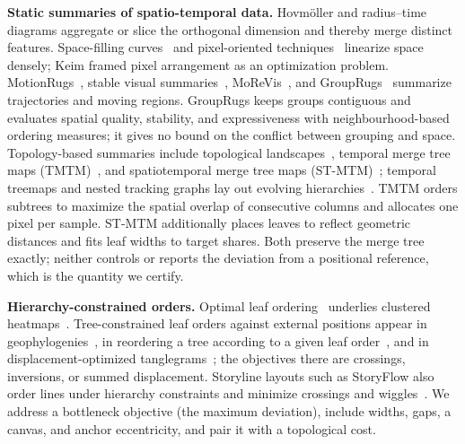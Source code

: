 \documentclass[review]{vgtc}                 %
\begin{document}
\textbf{Static summaries of spatio-temporal data.}
Hovm\"oller and radius--time diagrams aggregate or slice the orthogonal dimension and thereby merge distinct features. Space-filling curves~\cite{Franke:2021:1DP,Zhou:2021:DSF} and pixel-oriented techniques~\cite{Keim:2000:PIX} linearize space densely; Keim framed pixel arrangement as an optimization problem. MotionRugs~\cite{Buchmueller:2019:MR}, stable visual summaries~\cite{Wulms:2021:SVS}, MoReVis~\cite{Valdrighi:2024:MRV}, and GroupRugs~\cite{Stolk:2025:GR} summarize trajectories and moving regions. GroupRugs keeps groups contiguous and evaluates spatial quality, stability, and expressiveness with neighbourhood-based ordering measures; it gives no bound on the conflict between grouping and space. Topology-based summaries include topological landscapes~\cite{Weber:2007:TL,Beketayev:2012:GPTL}, temporal merge tree maps (TMTM)~\cite{Koepp:2023:TMTM}, and spatiotemporal merge tree maps (ST-MTM)~\cite{STMTM:2026}; temporal treemaps and nested tracking graphs lay out evolving hierarchies~\cite{Koepp:2019:TT,Lukasczyk:2017:NTG}. TMTM orders subtrees to maximize the spatial overlap of consecutive columns and allocates one pixel per sample. ST-MTM additionally places leaves to reflect geometric distances and fits leaf widths to target shares. Both preserve the merge tree exactly; neither controls or reports the deviation from a positional reference, which is the quantity we certify.

\textbf{Hierarchy-constrained orders.}
Optimal leaf ordering~\cite{BarJoseph:2001:OLO} underlies clustered heatmaps~\cite{Eisen:1998:CA}. Tree-constrained leaf orders against external positions appear in geophylogenies~\cite{Klawitter:2025:GP}, in reordering a tree according to a given leaf order~\cite{Bulteau:2022:RT}, and in displacement-optimized tanglegrams~\cite{Huson:2026:DOT}; the objectives there are crossings, inversions, or summed displacement. Storyline layouts such as StoryFlow also order lines under hierarchy constraints and minimize crossings and wiggles~\cite{Liu:2013:SF}. We address a bottleneck objective (the maximum deviation), include widths, gaps, a canvas, and anchor eccentricity, and pair it with a topological cost.
\end{document}
